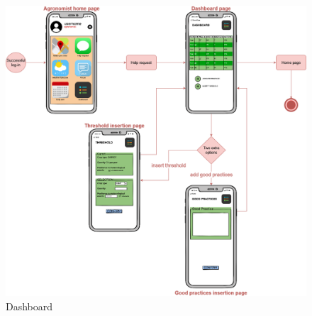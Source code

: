 \begin{center}
    \begin{figure}[H]
        \includegraphics[width=\textwidth]{Images/UserInterface/Diagram/dashboard.drawio.png}
        \caption{Dashboard}
    \end{figure}
\end{center}
\newpage




